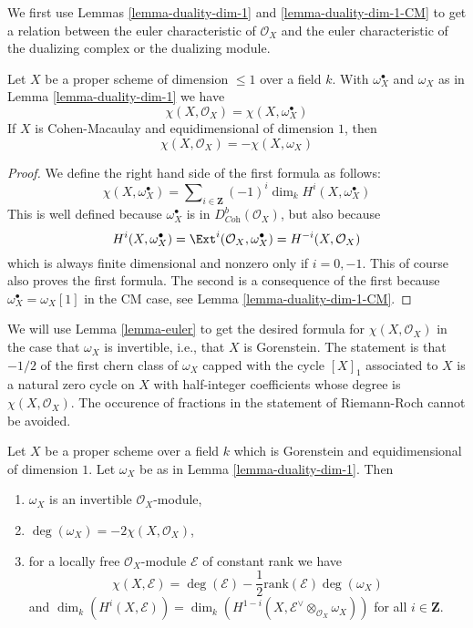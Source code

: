 \medskip\noindent
We first use Lemmas \ref{lemma-duality-dim-1} and \ref{lemma-duality-dim-1-CM}
to get a relation between the euler
characteristic of $\mathcal{O}_X$ and the euler characteristic
of the dualizing complex or the dualizing module.

\begin{lemma}
\label{lemma-euler}
Let $X$ be a proper scheme of dimension $\leq 1$ over a field $k$.
With $\omega_X^\bullet$ and $\omega_X$ as in Lemma \ref{lemma-duality-dim-1}
we have
$$
\chi(X, \mathcal{O}_X) = \chi(X, \omega_X^\bullet)
$$
If $X$ is Cohen-Macaulay and equidimensional of dimension $1$, then
$$
\chi(X, \mathcal{O}_X) = - \chi(X, \omega_X)
$$
\end{lemma}

\begin{proof}
We define the right hand side of the first formula as follows:
$$
\chi(X, \omega_X^\bullet) =
\sum\nolimits_{i \in \mathbf{Z}} (-1)^i\dim_k H^i(X, \omega_X^\bullet)
$$
This is well defined because $\omega_X^\bullet$ is in
$D^b_{\textit{Coh}}(\mathcal{O}_X)$, but also because
$$
H^i(X, \omega_X^\bullet) =
\Ext^i(\mathcal{O}_X, \omega_X^\bullet) =
H^{-i}(X, \mathcal{O}_X)
$$
which is always finite dimensional and nonzero only if $i = 0, -1$.
This of course also proves the first formula. The second is a consequence
of the first because $\omega_X^\bullet = \omega_X[1]$ in the CM case, see
Lemma \ref{lemma-duality-dim-1-CM}.
\end{proof}

\noindent
We will use Lemma \ref{lemma-euler} to get the desired formula for
$\chi(X, \mathcal{O}_X)$ in the case that $\omega_X$ is
invertible, i.e., that $X$ is Gorenstein.
The statement is that $-1/2$ of the first chern class of $\omega_X$
capped with the cycle $[X]_1$ associated to $X$ is a natural zero
cycle on $X$ with half-integer coefficients whose degree is
$\chi(X, \mathcal{O}_X)$.
The occurence of fractions in the statement of Riemann-Roch cannot
be avoided.

\begin{lemma}
\label{lemma-rr}
Let $X$ be a proper scheme over a field $k$ which is Gorenstein and
equidimensional of dimension $1$. Let $\omega_X$ be as in
Lemma \ref{lemma-duality-dim-1}. Then
\begin{enumerate}
\item $\omega_X$ is an invertible $\mathcal{O}_X$-module,
\item $\deg(\omega_X) = -2\chi(X, \mathcal{O}_X)$,
\item for a locally free $\mathcal{O}_X$-module $\mathcal{E}$
of constant rank we have
$$
\chi(X, \mathcal{E}) = \deg(\mathcal{E}) -
\textstyle{\frac{1}{2}} \text{rank}(\mathcal{E}) \deg(\omega_X)
$$
and $\dim_k(H^i(X, \mathcal{E})) =
\dim_k(H^{1 - i}(X, \mathcal{E}^\vee \otimes_{\mathcal{O}_X} \omega_X))$
for all $i \in \mathbf{Z}$.
\end{enumerate}
\end{lemma}

